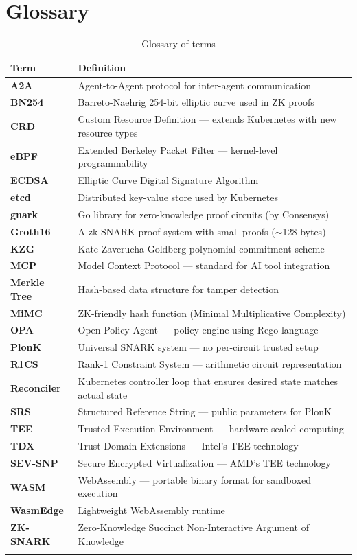\documentclass[12pt,a4paper,openany]{report}
\begin{document}
\chapter{Glossary}

\begin{longtable}{p{4cm}p{10cm}}
\toprule
\textbf{Term} & \textbf{Definition} \\
\midrule
\endhead
\textbf{A2A} & Agent-to-Agent protocol for inter-agent communication \\
\textbf{BN254} & Barreto-Naehrig 254-bit elliptic curve used in ZK proofs \\
\textbf{CRD} & Custom Resource Definition — extends Kubernetes with new resource types \\
\textbf{eBPF} & Extended Berkeley Packet Filter — kernel-level programmability \\
\textbf{ECDSA} & Elliptic Curve Digital Signature Algorithm \\
\textbf{etcd} & Distributed key-value store used by Kubernetes \\
\textbf{gnark} & Go library for zero-knowledge proof circuits (by Consensys) \\
\textbf{Groth16} & A zk-SNARK proof system with small proofs ($\sim$128 bytes) \\
\textbf{KZG} & Kate-Zaverucha-Goldberg polynomial commitment scheme \\
\textbf{MCP} & Model Context Protocol — standard for AI tool integration \\
\textbf{Merkle Tree} & Hash-based data structure for tamper detection \\
\textbf{MiMC} & ZK-friendly hash function (Minimal Multiplicative Complexity) \\
\textbf{OPA} & Open Policy Agent — policy engine using Rego language \\
\textbf{PlonK} & Universal SNARK system — no per-circuit trusted setup \\
\textbf{R1CS} & Rank-1 Constraint System — arithmetic circuit representation \\
\textbf{Reconciler} & Kubernetes controller loop that ensures desired state matches actual state \\
\textbf{SRS} & Structured Reference String — public parameters for PlonK \\
\textbf{TEE} & Trusted Execution Environment — hardware-sealed computing \\
\textbf{TDX} & Trust Domain Extensions — Intel's TEE technology \\
\textbf{SEV-SNP} & Secure Encrypted Virtualization — AMD's TEE technology \\
\textbf{WASM} & WebAssembly — portable binary format for sandboxed execution \\
\textbf{WasmEdge} & Lightweight WebAssembly runtime \\
\textbf{ZK-SNARK} & Zero-Knowledge Succinct Non-Interactive Argument of Knowledge \\
\bottomrule
\caption{Glossary of terms}
\end{longtable}
\end{document}
